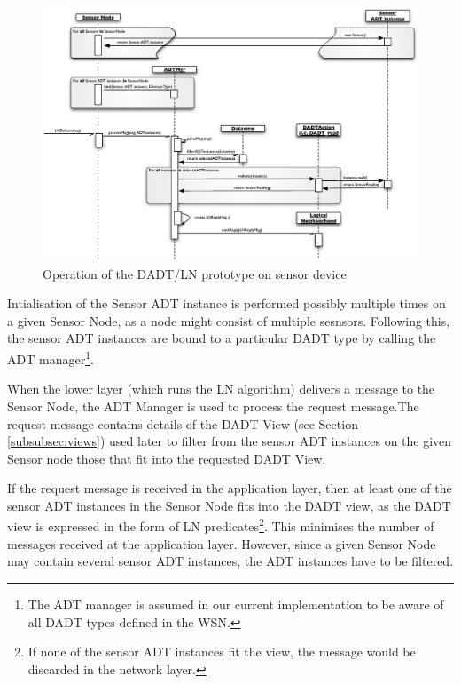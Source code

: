 \begin{figure}
\centering
\includegraphics[width=\textwidth]{img/SeqDiagram_Sensornode.eps}
\caption[Operation of the DADT/LN prototype on sensor device]{Operation of the DADT/LN prototype on sensor device}
\label{Fig:SeqDiagram_Sensornode}
\end{figure}

Intialisation of the Sensor ADT instance is performed possibly
multiple times on a given Sensor Node, as a node might consist of multiple sesnsors. Following
this, the sensor ADT instances are bound to a particular DADT type by calling
the ADT manager\footnote{The ADT manager is assumed in our
current implementation to be aware of all DADT types defined in the WSN.}.

When the lower layer (which runs the LN algorithm) delivers a message to the
Sensor Node, the ADT Manager is used to process the request message.The
request message contains details of the DADT View (see Section
\ref{subsubsec:views}) used later to filter from the sensor ADT
instances on the given Sensor node those that fit into the requested DADT View. 

If the request message is received in the application layer, then at least one of
the sensor ADT instances in the Sensor Node fits into the DADT view, as the DADT
view is expressed in the form of LN predicates\footnote{If none of the sensor ADT instances fit the view, the message would be discarded in the network layer.}. This minimises the number of
messages received at the application layer. However, since a given Sensor Node
may contain several sensor ADT instances, the ADT instances have to be filtered.

